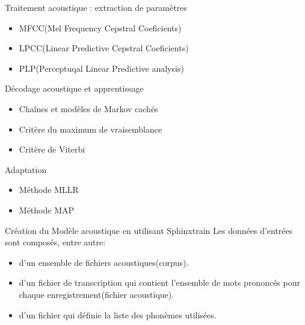 \begin{frame}{Traitement acoustique : extraction de paramètres}
	\begin{itemize}
	\item MFCC(Mel Frequency Cepstral Coeficients)
	\item LPCC(Linear Predictive Cepstral Coeficients)
	\item PLP(Perceptuqal Linear Predictive analysis)
	\end{itemize}
\end{frame}

\begin{frame}{Décodage acoustique et apprentissage}

\begin{itemize}
\item Chaînes et modèles de Markov cachés  
\item Critère du maximum de vraisemblance
\item Critère de Viterbi
\end{itemize}

\end{frame}

\begin{frame}{Adaptation}
\begin{itemize}
\item Méthode MLLR
\item Méthode MAP
\end{itemize}

\end{frame}

\begin{frame}{Création du Modèle acoustique en utilisant Sphinxtrain}
Les données d'entrées sont composés, entre autre:
\begin{itemize}
\item d'un ensemble de fichiers acoustiques(corpus).
\item d'un fichier de transcription qui contient l'ensemble de mots prononcés pour chaque enregistrement(fichier acoustique).
\item d'un fichier qui définie la liste des phonèmes utilisées.
\end{itemize}
\end{frame}